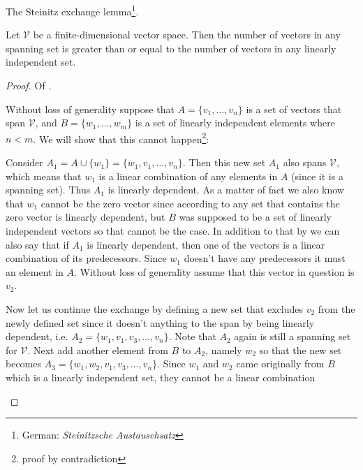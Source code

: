 \begin{lemma}\label{steinitz-exchange-lemma}
	The Steinitz exchange lemma\footnote{German: \textit{Steinitzsche Austauschsatz}}.
	\begin{flushleft}
		Let $\mathcal{V}$ be a finite-dimensional vector space. Then the number
		of vectors in any spanning set is greater than or equal to the number of
		vectors in any linearly independent set.
	\end{flushleft}
\end{lemma}

\begin{proof}
	Of .
	\begin{flushleft}
		Without loss of generality suppose that $A=\{v_1,\dots,v_n\}$ is a set
		of vectors that span $\mathcal{V}$, and $B=\{w_1,\dots,w_m\}$ is a set
		of linearly independent elements where $n < m$. We will show that this
		cannot happen\footnote{proof by contradiction}:
	\end{flushleft}
	\begin{flushleft}
		Consider $A_1=A\cup\{w_1\}=\{w_1,v_1,\dots,v_n\}$. Then this new set $A_1$
		also spans $\mathcal{V}$, which means that $w_1$ is a linear combination
		of any elements in $A$ (since it is a spanning set). Thus $A_1$ is
		linearly dependent. As a matter of fact we also know that $w_1$ cannot
		be the zero vector since according to 
		any set that contains the zero vector is linearly dependent, but $B$ was
		supposed to be a set of linearly independent vectors so that cannot be
		the case. In addition to that by 
		we can also say that if $A_1$ is linearly dependent, then one of the
		vectors is a linear combination of its predecessors. Since $w_1$ doesn't have
		any predecessors it must an element in $A$. Without loss of generality
		assume that this vector in question is $v_2$.
	\end{flushleft}
	\begin{flushleft}
		Now let us continue the exchange by defining a new set that excludes $v_2$
		from the newly defined set since it doesn't anything to the span by being
		linearly dependent, i.e. $A_2=\{w_1,v_1,v_3,\dots,v_n\}$. Note that $A_2$
		again is still a spanning set for $\mathcal{V}$. Next add another element
		from $B$ to $A_2$, namely $w_2$ so that the new set becomes
		$A_3=\{w_1,w_2,v_1,v_3,\dots,v_n\}$. Since $w_1$ and $w_2$ came originally
		from $B$ which is a linearly independent set, they cannot be a linear combination

\end{flushleft}
\end{proof}
